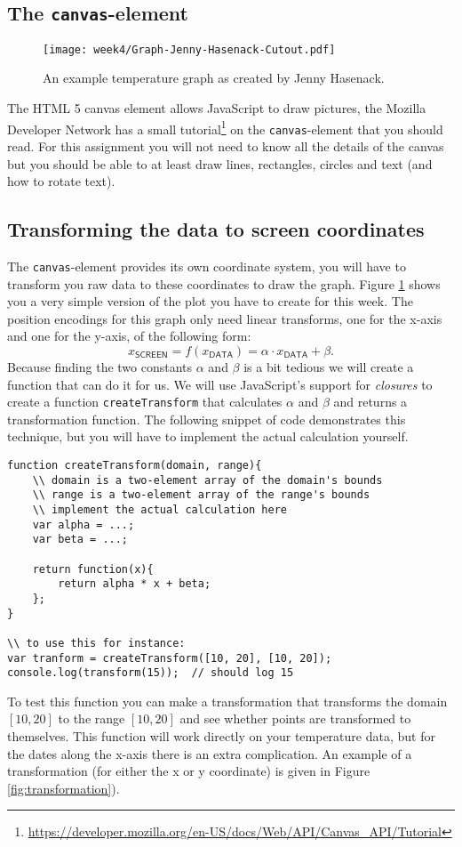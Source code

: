 \subsection{The \texttt{canvas}-element}
\begin{figure}
\centering
\texttt{[image: week4/Graph-Jenny-Hasenack-Cutout.pdf]}
\caption{An example temperature graph as created by Jenny Hasenack.}\label{fig:lineplot}
\end{figure}
The HTML 5 canvas element allows JavaScript to draw pictures, the Mozilla
Developer Network has a small tutorial\footnote{
\url{https://developer.mozilla.org/en-US/docs/Web/API/Canvas\_API/Tutorial}}
on the \texttt{canvas}-element that you should read. For this assignment you
will not need to know all the details of the canvas but you should be able 
to at least draw lines, rectangles, circles and text (and how to rotate text).

\subsection{Transforming the data to screen coordinates}
The \texttt{canvas}-element provides its own coordinate system, you will have
to transform you raw data to these coordinates to draw the graph. Figure 
\ref{fig:lineplot} shows you a very simple version of the plot you have to
create for this week. The position encodings for this graph only need linear
transforms, one for the x-axis and one for the y-axis, of the following form:
\[
x_{\mathsf{SCREEN}} = f\left(x_{\mathsf{DATA}}\right) = \alpha \cdot x_{\mathsf{DATA}} + \beta.
\]
Because finding the two constants $\alpha$ and $\beta$ is a bit tedious we 
will create a function that can do it for us. We will use JavaScript's 
support for \emph{closures} to create a function \texttt{createTransform}
that calculates $\alpha$ and $\beta$ and returns a transformation function. The
following snippet of code demonstrates this technique, but you will have to
implement the actual calculation yourself.
\begin{verbatim}
function createTransform(domain, range){
    \\ domain is a two-element array of the domain's bounds
    \\ range is a two-element array of the range's bounds
    \\ implement the actual calculation here
    var alpha = ...;
    var beta = ...;

    return function(x){
        return alpha * x + beta;
    };
}

\\ to use this for instance:
var tranform = createTransform([10, 20], [10, 20]);
console.log(transform(15));  // should log 15
\end{verbatim}
To test this function you can make a transformation that transforms the 
domain $[10, 20]$ to the range $[10, 20]$ and see whether points are
transformed to themselves. This function will work directly on your 
temperature data, but for the dates along the x-axis there is an extra 
complication. An example of a transformation (for either the x or y 
coordinate) is given in Figure \ref{fig:transformation}).

